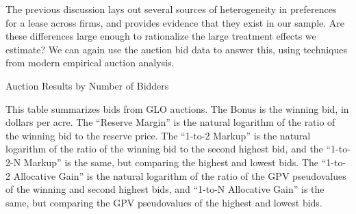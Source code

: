 \documentclass[12pt]{article}
\begin{document}
The previous discussion lays out several sources of heterogeneity in preferences for a lease across firms, and provides evidence that they exist in our sample.  Are these differences large enough to rationalize the large treatment effects we estimate? We can again use the auction bid data to answer this, using techniques from modern empirical auction analysis.

\addtolength{\tabcolsep}{-18pt}
\begin{table}[H]
\begin{center}
\begin{threeparttable}
	\caption{Auction Results by Number of Bidders}
	\label{tab:AuctionNBids}
 	\small
   	            
    \footnotesize
    \begin{tablenotes}
    	\item This table summarizes bids from GLO auctions. The Bonus is the winning bid, in dollars per acre.  The ``Reserve Margin'' is the natural logarithm of the ratio of the winning bid to the reserve price.  The ``1-to-2 Markup'' is the natural logarithm of the ratio of the winning bid to the second highest bid, and the ``1-to-2-N Markup'' is the same, but comparing the highest and lowest bids.  The ``1-to-2 Allocative Gain'' is the natural logarithm of the ratio of the GPV pseudovalues of the winning and second highest bids, and ``1-to-N Allocative Gain'' is the same, but comparing the GPV pseudovalues of the highest and lowest bids.
    \end{tablenotes}
\end{threeparttable}
\end{center}	
\end{table}
\end{document}
